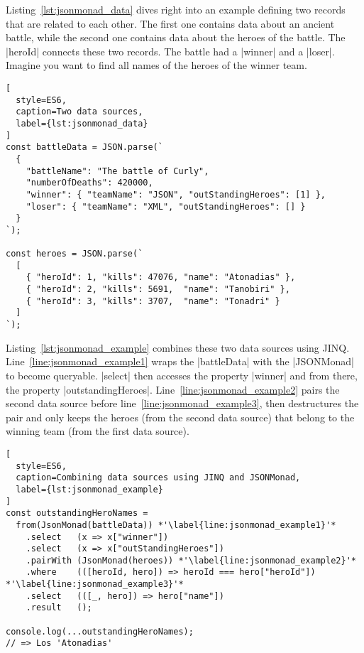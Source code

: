 Listing~\ref{lst:jsonmonad_data} dives right into an example defining two
records that are related to each other. The first one contains data about an
ancient battle, while the second one contains data about the heroes of the
battle. The |heroId| connects these two records. The battle had a |winner| and
a |loser|. Imagine you want to find all names of the heroes of the winner team.

\begin{lstlisting}[
  style=ES6,
  caption=Two data sources,
  label={lst:jsonmonad_data}
]
const battleData = JSON.parse(`
  {
    "battleName": "The battle of Curly",
    "numberOfDeaths": 420000,
    "winner": { "teamName": "JSON", "outStandingHeroes": [1] },
    "loser": { "teamName": "XML", "outStandingHeroes": [] }
  }
`);

const heroes = JSON.parse(`
  [
    { "heroId": 1, "kills": 47076, "name": "Atonadias" },
    { "heroId": 2, "kills": 5691,  "name": "Tanobiri" },
    { "heroId": 3, "kills": 3707,  "name": "Tonadri" }
  ]
`);
\end{lstlisting}

Listing~\ref{lst:jsonmonad_example} combines these two data sources using JINQ.
Line~\ref{line:jsonmonad_example1} wraps the |battleData| with the |JSONMonad|
to become queryable. |select| then accesses the property |winner| and from
there, the property |outstandingHeroes|. Line~\ref{line:jsonmonad_example2}
pairs the second data source before line~\ref{line:jsonmonad_example3}, then
destructures the pair and only keeps the heroes (from the second data source)
that belong to the winning team (from the first data source).

\begin{lstlisting}[
  style=ES6,
  caption=Combining data sources using JINQ and JSONMonad,
  label={lst:jsonmonad_example}
]
const outstandingHeroNames =
  from(JsonMonad(battleData)) *'\label{line:jsonmonad_example1}'*
    .select   (x => x["winner"])
    .select   (x => x["outStandingHeroes"])
    .pairWith (JsonMonad(heroes)) *'\label{line:jsonmonad_example2}'*
    .where    (([heroId, hero]) => heroId === hero["heroId"]) *'\label{line:jsonmonad_example3}'*
    .select   (([_, hero]) => hero["name"])
    .result   ();

console.log(...outstandingHeroNames);
// => Los 'Atonadias'
\end{lstlisting}

